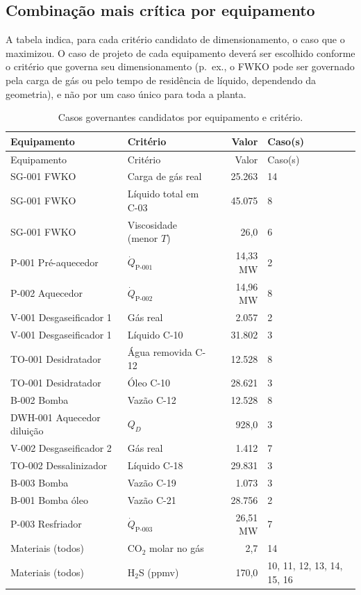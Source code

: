 \documentclass[11pt,a4paper]{article}
\numberwithin{equation}{section}
\numberwithin{table}{section}
\numberwithin{figure}{section}
\begin{document}
\subsection{Combinação mais crítica por equipamento}
A tabela indica, para cada critério candidato de dimensionamento, o caso que o maximizou. O caso de projeto de cada equipamento deverá ser escolhido conforme o critério que governa seu dimensionamento (p.~ex., o FWKO pode ser governado pela carga de gás ou pelo tempo de residência de líquido, dependendo da geometria), e não por um caso único para toda a planta.
\begin{longtable}{L{4.0cm}L{4.5cm}rL{3.0cm}}
\caption{Casos governantes candidatos por equipamento e critério.}\label{tab:crit}\\\toprule
Equipamento & Critério & Valor & Caso(s)\\\midrule\endfirsthead
\toprule Equipamento & Critério & Valor & Caso(s)\\\midrule\endhead

SG-001 FWKO & Carga de gás real & 25.263 & 14\\
SG-001 FWKO & Líquido total em C-03 & 45.075 & 8\\
SG-001 FWKO & Viscosidade (menor $T$) & 26,0 & 6\\
P-001 Pré-aquecedor & $\dot Q_{\mbox{P-001}}$ & 14,33 MW & 2\\
P-002 Aquecedor & $\dot Q_{\mbox{P-002}}$ & 14,96 MW & 8\\
V-001 Desgaseificador 1 & Gás real & 2.057 & 2\\
V-001 Desgaseificador 1 & Líquido C-10 & 31.802 & 3\\
TO-001 Desidratador & Água removida C-12 & 12.528 & 8\\
TO-001 Desidratador & Óleo C-10 & 28.621 & 3\\
B-002 Bomba & Vazão C-12 & 12.528 & 8\\
DWH-001 Aquecedor diluição & $Q_D$ & 928,0 & 3\\
V-002 Desgaseificador 2 & Gás real & 1.412 & 7\\
TO-002 Dessalinizador & Líquido C-18 & 29.831 & 3\\
B-003 Bomba & Vazão C-19 & 1.073 & 3\\
B-001 Bomba óleo & Vazão C-21 & 28.756 & 2\\
P-003 Resfriador & $\dot Q_{\mbox{P-003}}$ & 26,51 MW & 7\\
Materiais (todos) & CO$_2$ molar no gás & 2,7 & 14\\
Materiais (todos) & H$_2$S (ppmv) & 170,0 & 10, 11, 12, 13, 14, 15, 16\\
\bottomrule\end{longtable}
\end{document}
